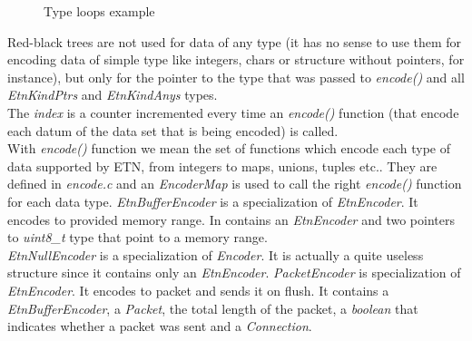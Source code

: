 \begin{figure}[H]
\centering


\caption{Type loops example}
\end{figure}

Red-black trees are not used for data of any type (it has no sense to use them for encoding data of simple type like integers, chars or structure without pointers, for instance), but only for the pointer to the type that was passed to \emph{encode()} and all \emph{EtnKindPtrs} and \emph{EtnKindAnys} types. \\
The \emph{index} is a counter incremented every time an \emph{encode()} function (that encode each datum of the data set that is being encoded) is called. \\
With \emph{encode()} function we mean the set of functions which encode each type of data supported by ETN, from integers to maps, unions, tuples etc.. They are defined in \emph{encode.c} and an \emph{EncoderMap} is used to call the right \emph{encode()} function for each data type.
\emph{EtnBufferEncoder} is a specialization of \emph{EtnEncoder}. It encodes to provided memory range. In contains an \emph{EtnEncoder} and two pointers to \emph{uint8\_t} type that point to a memory range.\\
\emph{EtnNullEncoder} is a specialization of \emph{Encoder}. It is actually a quite useless structure since it contains only an \emph{EtnEncoder}.
\emph{PacketEncoder} is specialization of \emph{EtnEncoder}. 
It encodes to packet and sends it on flush. It contains a \emph{EtnBufferEncoder}, a \emph{Packet}, the total length of the packet, a \emph{boolean} that indicates whether a packet was sent and a \emph{Connection}. 



















